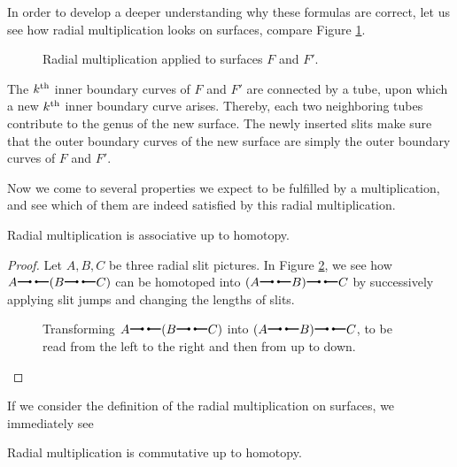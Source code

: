 In order to develop a deeper understanding why these formulas are correct,  
let us see how radial multiplication looks on surfaces, compare Figure \ref{homology_op:radial_mult_on_modspc}.

\begin{figure}[ht]
\centering
\def\svgwidth{0.8\columnwidth}

\caption{\label{homology_op:radial_mult_on_modspc} Radial multiplication applied to surfaces $F$ and $F'$.}
\end{figure}

The $k^{\text{th}}$ inner boundary curves of $F$ and $F'$ are connected by a tube, upon which a new $k^{\text{th}}$ inner boundary curve arises.
Thereby, each two neighboring tubes contribute to the genus of the new surface.
The newly inserted slits make sure that the outer boundary curves of the new surface are simply the outer boundary curves of $F$ and $F'$. 

Now we come to several properties we expect to be fulfilled by a multiplication,
and see which of them are indeed satisfied by this radial multiplication.

\begin{prop}
Radial multiplication is associative up to homotopy.
\begin{proof}
   Let $A, B, C$ be three radial slit pictures. 
   In Figure \ref{homology_op:radial_mult_associative}, we see how $A \radmult (B \radmult C)$ can be homotoped into $(A \radmult B) \radmult C$
   by successively applying slit jumps and changing the lengths of slits.
   \begin{figure}[hp]
   \centering
   \vspace{1cm}
   \centering
   \vspace{1cm}
   \centering
   \caption{\label{homology_op:radial_mult_associative} Transforming $A \radmult (B \radmult C)$ into $(A \radmult B) \radmult C$, to be read from the left to the right and then from up to down.}
   \end{figure}
\end{proof}
\end{prop}

If we consider the definition of the radial multiplication on surfaces, we immediately see

\begin{prop}
   Radial multiplication is commutative up to homotopy.
\end{prop}

